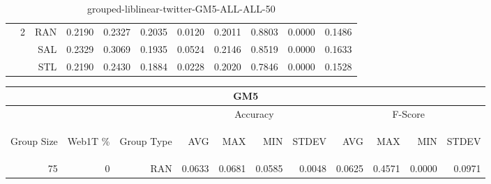 \begin{center}
\begin{table}[htbp]
\begin{center}
\begin{tabular}{ | r | r | r | r | r | r | r | r | r | r | r |}
 & \multirow{3}{*}{2} & RAN & 0.2190 & 0.2327 & 0.2035 & 0.0120 & 0.2011 & 0.8803 & 0.0000 & 0.1486\\ \cline{3-11}
 &   & SAL & 0.2329 & 0.3069 & 0.1935 & 0.0524 & 0.2146 & 0.8519 & 0.0000 & 0.1633\\ \cline{3-11}
 &   & STL & 0.2190 & 0.2430 & 0.1884 & 0.0228 & 0.2020 & 0.7846 & 0.0000 & 0.1528\\ \cline{2-11}
\hline
\end{tabular}
\caption{grouped-liblinear-twitter-GM5-ALL-ALL-50}
\end{center}
 \end{table}
\end{center}

\begin{center}
\begin{table}[htbp] 
 \begin{center}
\begin{tabular}{ | r | r | r | r | r | r | r | r | r | r | r |}
\hline
\multicolumn{11}{|c|}{GM5}\\
\hline
 & & & \multicolumn{4}{|c|}{Accuracy} & \multicolumn{4}{|c|}{F-Score}\\ \cline{4-11}
\begin{sideways}Group Size\end{sideways} & \begin{sideways}Web1T \%\end{sideways} & \begin{sideways}Group Type\end{sideways} & \begin{sideways}AVG\end{sideways} & \begin{sideways}MAX\end{sideways} & \begin{sideways}MIN\end{sideways} & \begin{sideways}STDEV\end{sideways} & \begin{sideways}AVG\end{sideways} & \begin{sideways}MAX\end{sideways} & \begin{sideways}MIN\end{sideways} & \begin{sideways}STDEV\end{sideways}\\
\hline
\multirow{9}{*}{75}
 & \multirow{3}{*}{0} & RAN & 0.0633 & 0.0681 & 0.0585 & 0.0048 & 0.0625 & 0.4571 & 0.0000 & 0.0971\\ \cline{3-11}

\end{tabular}
\end{center}
\end{table}
\end{center}
